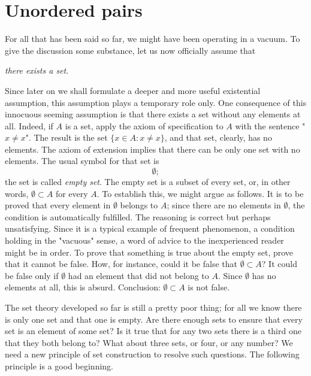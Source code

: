 \section{Unordered pairs}

For all that has been said so far, we might have been operating in a vacuum. To give the discussion some substance, let us now officially assume that
\begin{center}
	\textit{there exists a set}.
\end{center}
Since later on we shall formulate a deeper and more useful existential assumption, this assumption plays a temporary role only. One consequence of this innocuous seeming assumption is that there exists a set without any elements at all. Indeed, if $A$ is a set, apply the axiom of specification to $A$ with the sentence "$x \neq x$". The result is the set $\{x \in A :x \neq x\}$, and that set, clearly, has no elements. The axiom of extension implies that there can be only one set with no elements. The usual symbol for that set is
\[
	\emptyset;
\]
the set is called \textit{empty set}. The empty set is a subset of every set, or, in other words, $\emptyset \subset A$ for every $A$. To establish this, we might argue as follows. It is to be proved that every element in $\emptyset$ belongs to $A$; since there are no elements in $\emptyset$, the condition is automatically fulfilled. The reasoning is correct but perhaps unsatisfying. Since it is a typical example of frequent phenomenon, a condition holding in the "vacuous" sense, a word of advice to the inexperienced reader might be in order. To prove that something is true about the empty set, prove that it cannot be false. How, for instance, could it be false that $\emptyset \subset A$? It could be false only if $\emptyset$ had an element that did not belong to $A$. Since $\emptyset$ has no elements at all, this is absurd. Conclusion: $\emptyset \subset A$ is not false.

The set theory developed so far is still a pretty poor thing; for all we know there is only one set and that one is empty. Are there enough sets to ensure that every set is an element of some set? Is it true that for any two sets there is a third one that they both belong to? What about three sets, or four, or any number? We need a new principle of set construction to resolve such questions. The following principle is a good beginning.


